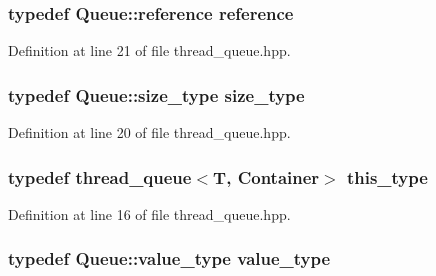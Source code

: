 \hypertarget{classyuh_1_1thread__queue_a2290230a4818fa015496b463bf8e4b0c}{
\subsubsection[{reference}]{\setlength{\rightskip}{0pt plus 5cm}typedef \-Queue\-::reference {\bf reference}}}\label{d2/d54/classyuh_1_1thread__queue_a2290230a4818fa015496b463bf8e4b0c}


\-Definition at line 21 of file thread\-\_\-queue.\-hpp.

\hypertarget{classyuh_1_1thread__queue_a8e7cd930c132420fd043346d2357cc1a}{
\subsubsection[{size\-\_\-type}]{\setlength{\rightskip}{0pt plus 5cm}typedef \-Queue\-::size\-\_\-type {\bf size\-\_\-type}}}\label{d2/d54/classyuh_1_1thread__queue_a8e7cd930c132420fd043346d2357cc1a}


\-Definition at line 20 of file thread\-\_\-queue.\-hpp.

\hypertarget{classyuh_1_1thread__queue_a0b6cc122d5afe5dba8a2622add14ec45}{
\subsubsection[{this\-\_\-type}]{\setlength{\rightskip}{0pt plus 5cm}typedef {\bf thread\-\_\-queue}$<$\-T, \-Container$>$ {\bf this\-\_\-type}}}\label{d2/d54/classyuh_1_1thread__queue_a0b6cc122d5afe5dba8a2622add14ec45}


\-Definition at line 16 of file thread\-\_\-queue.\-hpp.

\hypertarget{classyuh_1_1thread__queue_a6e0ae4bff8abfada948f8f378e5c701f}{
\subsubsection[{value\-\_\-type}]{\setlength{\rightskip}{0pt plus 5cm}typedef \-Queue\-::value\-\_\-type {\bf value\-\_\-type}}}\label{d2/d54/classyuh_1_1thread__queue_a6e0ae4bff8abfada948f8f378e5c701f}


